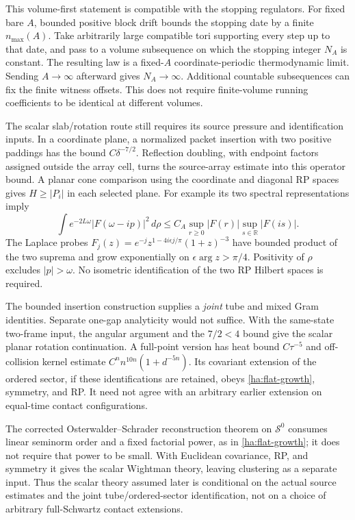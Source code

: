 This volume-first statement is compatible with the stopping regulators.
For fixed bare $A$, bounded positive block drift bounds the stopping
date by a finite $n_{\max}(A)$.  Take arbitrarily large compatible tori
supporting every step up to that date, and pass to a volume subsequence
on which the stopping integer $N_A$ is constant.  The resulting law is
a fixed-$A$ coordinate-periodic thermodynamic limit.  Sending
$A\to\infty$ afterward gives $N_A\to\infty$.  Additional countable
subsequences can fix the finite witness offsets.  This does not require
finite-volume running coefficients to be identical at different volumes.

The scalar slab/rotation route still requires its source pressure and
identification inputs.  In a coordinate plane, a normalized packet
insertion with two positive paddings has the bound
$C\delta^{-7/2}$.  Reflection doubling, with endpoint factors assigned
outside the array cell, turns the source-array estimate into this
operator bound.  A planar cone comparison using the coordinate and
diagonal RP spaces gives $H\geq |P_i|$ in each selected plane.
For example its two spectral representations imply
\begin{equation}
 \int e^{-2L\omega}|F(\omega-ip)|^2\,d\rho
 \leq C_A\sup_{r\geq0}|F(r)|\sup_{s\in\mathbb R}|F(is)|.
 \label{ha:cone-probe}
\end{equation}
The Laplace probes
$F_j(z)=e^{-j}z^{1-4i\epsilon j/\pi}(1+z)^{-3}$
have bounded product of the two suprema and grow exponentially on
$\epsilon\arg z>\pi/4$.  Positivity of $\rho$ excludes $|p|>\omega$.
No isometric identification of the two RP Hilbert spaces is required.

The bounded insertion construction supplies a \emph{joint} tube and
mixed Gram identities.  Separate one-gap analyticity would not suffice.
With the same-state two-frame input, the angular argument and the
$7/2<4$ bound give the scalar planar rotation continuation.  A full-point
version has heat bound $C\tau^{-5}$ and off-collision kernel estimate
$C^n n^{10n}(1+d^{-5n})$.  Its covariant extension of the ordered sector,
if these identifications are retained, obeys
\eqref{ha:flat-growth}, symmetry, and RP.  It need not agree with an
arbitrary earlier extension on equal-time contact configurations.

The corrected Osterwalder--Schrader reconstruction theorem on
$\mathcal S^0$ consumes linear seminorm order and a fixed factorial
power, as in \eqref{ha:flat-growth}; it does not require that power to
be small.  With Euclidean covariance, RP, and symmetry it gives the
scalar Wightman theory, leaving clustering as a separate input.
Thus the scalar theory assumed later is conditional on the actual
source estimates and the joint tube/ordered-sector identification,
not on a choice of arbitrary full-Schwartz contact extensions.

